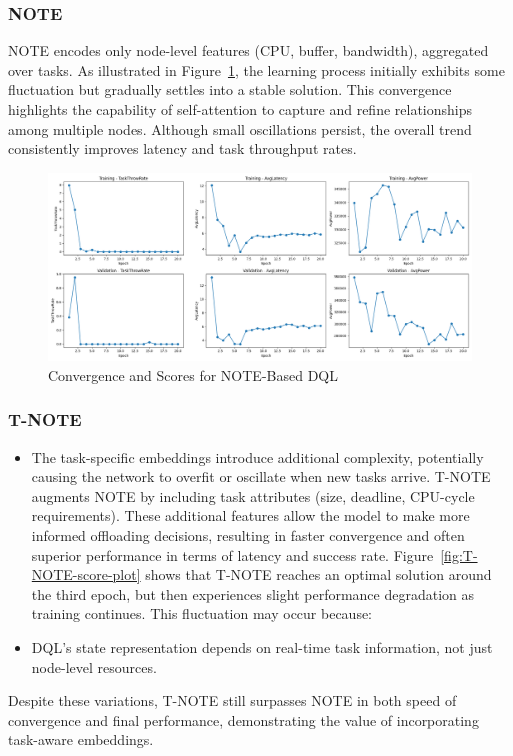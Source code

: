 \documentclass[preprint,3p,authoryear]{elsarticle}
\begin{document}
\subsubsection{NOTE}
NOTE encodes only node-level features (CPU, buffer, bandwidth), aggregated over tasks. As illustrated in Figure~\ref{fig:NOTE-score-plot}, the learning process initially exhibits some fluctuation but gradually settles into a stable solution. This convergence highlights the capability of self-attention to capture and refine relationships among multiple nodes. Although small oscillations persist, the overall trend consistently improves latency and task throughput rates.

\begin{figure}[H]
    \centering
    \includegraphics[width=1\linewidth]{figs/NOTE/score_plot.png}
    \caption{Convergence and Scores for NOTE-Based DQL}
    \label{fig:NOTE-score-plot}
\end{figure}

\subsubsection{T-NOTE}
\begin{itemize}
    \item The task-specific embeddings introduce additional complexity, potentially causing the network to overfit or oscillate when new tasks arrive.
T-NOTE augments NOTE by including task attributes (size, deadline, CPU-cycle requirements). These additional features allow the model to make more informed offloading decisions, resulting in faster convergence and often superior performance in terms of latency and success rate. Figure~\ref{fig:T-NOTE-score-plot} shows that T-NOTE reaches an optimal solution around the third epoch, but then experiences slight performance degradation as training continues. This fluctuation may occur because:
    \item DQL’s state representation depends on real-time task information, not just node-level resources.
\end{itemize}
Despite these variations, T-NOTE still surpasses NOTE in both speed of convergence and final performance, demonstrating the value of incorporating task-aware embeddings.
\end{document}
